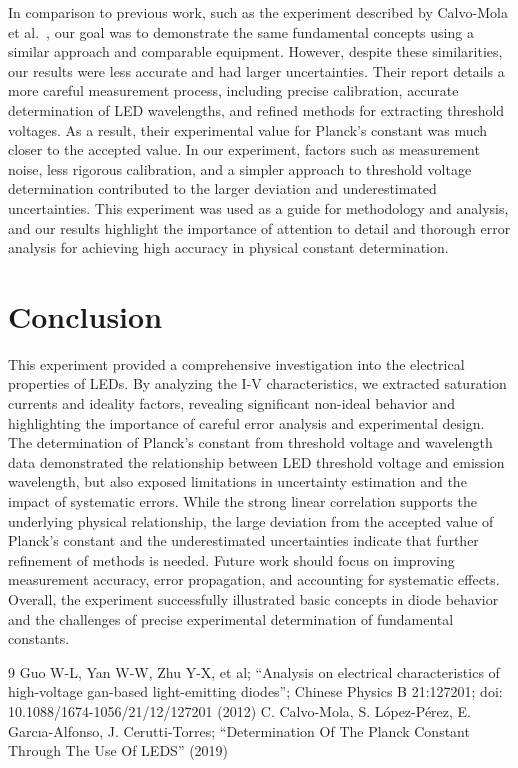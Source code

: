 \documentclass[12pt,a4paper]{article}
\begin{document}
In comparison to previous work, such as the experiment described by Calvo-Mola et al.~\cite{ref2}, our goal was to demonstrate the same fundamental concepts using a similar approach and comparable equipment. However, despite these similarities, our results were less accurate and had larger uncertainties. Their report details a more careful measurement process, including precise calibration, accurate determination of LED wavelengths, and refined methods for extracting threshold voltages. As a result, their experimental value for Planck's constant was much closer to the accepted value. In our experiment, factors such as measurement noise, less rigorous calibration, and a simpler approach to threshold voltage determination contributed to the larger deviation and underestimated uncertainties. This experiment was used as a guide for methodology and analysis, and our results highlight the importance of attention to detail and thorough error analysis for achieving high accuracy in physical constant determination.

\section{Conclusion}

This experiment provided a comprehensive investigation into the electrical properties of LEDs. By analyzing the I-V characteristics, we extracted saturation currents and ideality factors, revealing significant non-ideal behavior and highlighting the importance of careful error analysis and experimental design. The determination of Planck's constant from threshold voltage and wavelength data demonstrated the relationship between LED threshold voltage and emission wavelength, but also exposed limitations in uncertainty estimation and the impact of systematic errors. While the strong linear correlation supports the underlying physical relationship, the large deviation from the accepted value of Planck's constant and the underestimated uncertainties indicate that further refinement of methods is needed. Future work should focus on improving measurement accuracy, error propagation, and accounting for systematic effects. Overall, the experiment successfully illustrated basic concepts in diode behavior and the challenges of precise experimental determination of fundamental constants.

\begin{thebibliography}{9}
 Guo W-L, Yan W-W, Zhu Y-X, et al; “Analysis on electrical characteristics of high-voltage gan-based light-emitting diodes”; Chinese Physics B 21:127201; doi: 10.1088/1674-1056/21/12/127201 (2012)
 C. Calvo-Mola, S. López-Pérez, E. Garcıa-Alfonso, J. Cerutti-Torres; “Determination Of The Planck Constant Through The Use Of LEDS” (2019)
\end{thebibliography}
\end{document}
